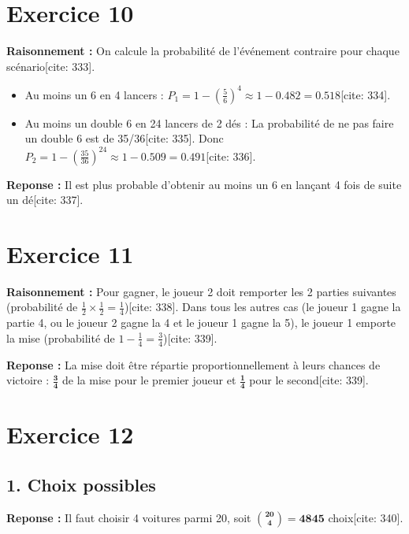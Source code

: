 \documentclass[11pt,a4paper]{article}
\begin{document}
\hrulefill

\section*{Exercice 10}

\textbf{Raisonnement :} On calcule la probabilité de l'événement contraire pour chaque scénario[cite: 333].
\begin{itemize}
    \item Au moins un 6 en 4 lancers : $P_1 = 1 - \left(\frac{5}{6}\right)^4 \approx 1 - 0.482 = 0.518$[cite: 334].
    \item Au moins un double 6 en 24 lancers de 2 dés : La probabilité de ne pas faire un double 6 est de 35/36[cite: 335]. Donc $P_2 = 1 - \left(\frac{35}{36}\right)^{24} \approx 1 - 0.509 = 0.491$[cite: 336].
\end{itemize}

\textbf{Reponse :} Il est plus probable d'obtenir au moins un 6 en lançant 4 fois de suite un dé[cite: 337].

\hrulefill

\section*{Exercice 11}

\textbf{Raisonnement :} Pour gagner, le joueur 2 doit remporter les 2 parties suivantes (probabilité de $\frac{1}{2} \times \frac{1}{2} = \frac{1}{4}$)[cite: 338]. Dans tous les autres cas (le joueur 1 gagne la partie 4, ou le joueur 2 gagne la 4 et le joueur 1 gagne la 5), le joueur 1 emporte la mise (probabilité de $1 - \frac{1}{4} = \frac{3}{4}$)[cite: 339].

\textbf{Reponse :} La mise doit être répartie proportionnellement à leurs chances de victoire : $\mathbf{\frac{3}{4}}$ de la mise pour le premier joueur et $\mathbf{\frac{1}{4}}$ pour le second[cite: 339].

\hrulefill

\section*{Exercice 12}

\subsection*{1. Choix possibles}

\textbf{Reponse :} Il faut choisir 4 voitures parmi 20, soit $\mathbf{\binom{20}{4} = 4845}$ choix[cite: 340].
\end{document}
